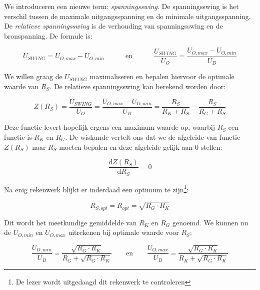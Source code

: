 \documentclass[12pt,a4paper,final,twoside,fleqn]{article}
\begin{document}
We introduceren een nieuwe term: \textsl{spanningsswing}. De spanningsswing is
het verschil tussen de maximale uitgangsspanning en de minimale uitgangsspanning.
De \textsl{relatieve spanningsswing} is de verhouding van spanningsswing en de
bronspanning. De formule is:

\begin{equation}
U_{SWING} = U_{O,max} - U_{O,min}\quad\qquad\text{en}\quad\qquad\dfrac{U_{SWING}}{U_O}=\dfrac{U_{O,max} - U_{O,min}}{U_B}
\end{equation}

We willen graag de $U_{SWING}$ maximaliseren en bepalen hiervoor de optimale waarde van $R_S$. De relatieve spanningsswing kan berekend worden door:

\begin{equation}
Z(R_S) = \dfrac{U_{SWING}}{U_O}=\dfrac{U_{O,max} - U_{O,min}}{U_B} = \dfrac{R_S}{R_K+R_S}-\dfrac{R_S}{R_G+R_S}
\end{equation}

Deze functie levert hopelijk ergens een maximum waarde op, waarbij $R_S$ een
functie is $R_K$ en $R_G$. De wiskunde vertelt ons dat we de afgeleide van
functie $Z(R_S)$ naar $R_S$ moeten bepalen en deze afgeleide gelijk aan $0$ stellen:

\begin{equation}
\dfrac{\text{d} Z(R_S)}{\text{d} R_S} = 0
\end{equation}

Na enig rekenwerk  blijkt er inderdaad een optimum te zijn\footnote{De lezer wordt
uitgedaagd dit rekenwerk te controleren}:

\begin{equation}
R_{S,opt} = R_{opt} = \sqrt{R_G\cdot R_K}
\end{equation}

Dit wordt het meetkundige gemiddelde van $R_K$ en $R_G$ genoemd. We kunnen
nu de $U_{O,min}$ en $U_{O,max}$ uitrekenen bij optimale waarde voor $R_S$:

\begin{equation}
\dfrac{U_{O,min}}{U_B} = \dfrac{\sqrt{R_G\cdot R_K}}{R_G + \sqrt{R_G\cdot R_K}}
\qquad\text{en}\qquad
\dfrac{U_{O,max}}{U_B} = \dfrac{\sqrt{R_G\cdot R_K}}{R_K + \sqrt{R_G\cdot R_K}}
\end{equation}
\end{document}
